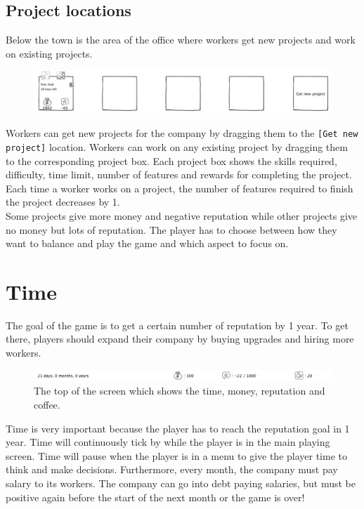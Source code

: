 \documentclass[11pt]{article}
\newcommand{\n}[0]{\\[\baselineskip]}
\begin{document}
\subsection{Project locations}
Below the town is the area of the office where workers get new projects and work on existing projects. 
\begin{figure}[H]
\centering
\includegraphics[width=1\textwidth, keepaspectratio]{imgs/office.png}
\end{figure}
\noindent
Workers can get new projects for the company by dragging them to the \texttt{[Get new project]} location. Workers can work on any existing project by dragging them to the corresponding project box. Each project box shows the skills required, difficulty, time limit, number of features and rewards for completing the project. Each time a worker works on a project, the number of features required to finish the project decreases by 1. 
\n
Some projects give more money and negative reputation while other projects give no money but lots of reputation. The player has to choose between how they want to balance and play the game and which aspect to focus on.

\section{Time}
The goal of the game is to get a certain number of reputation by 1 year. To get there, players should expand their company by buying upgrades and hiring more workers. 
\begin{figure}[H]
\centering
\includegraphics[width=1\textwidth, keepaspectratio]{imgs/topbar.png}
\caption{The top of the screen which shows the time, money, reputation and coffee.}
\end{figure}
\noindent
Time is very important because the player has to reach the reputation goal in 1 year. Time will continuously tick by while the player is in the main playing screen. Time will pause when the player is in a menu to give the player time to think and make decisions. Furthermore, every month, the company must pay salary to its workers. The company can go into debt paying salaries, but must be positive again before the start of the next month or the game is over!
\end{document}
